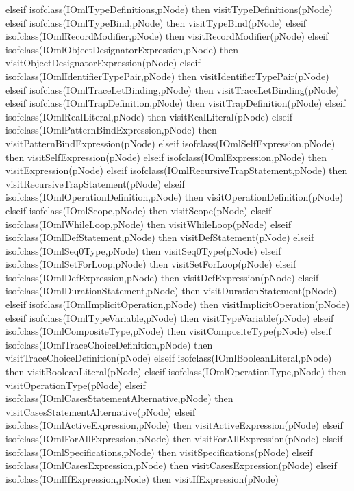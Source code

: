 \begin{vdm_al}
      elseif isofclass(IOmlTypeDefinitions,pNode) then visitTypeDefinitions(pNode)
      elseif isofclass(IOmlTypeBind,pNode) then visitTypeBind(pNode)
      elseif isofclass(IOmlRecordModifier,pNode) then visitRecordModifier(pNode)
      elseif isofclass(IOmlObjectDesignatorExpression,pNode) then visitObjectDesignatorExpression(pNode)
      elseif isofclass(IOmlIdentifierTypePair,pNode) then visitIdentifierTypePair(pNode)
      elseif isofclass(IOmlTraceLetBinding,pNode) then visitTraceLetBinding(pNode)
      elseif isofclass(IOmlTrapDefinition,pNode) then visitTrapDefinition(pNode)
      elseif isofclass(IOmlRealLiteral,pNode) then visitRealLiteral(pNode)
      elseif isofclass(IOmlPatternBindExpression,pNode) then visitPatternBindExpression(pNode)
      elseif isofclass(IOmlSelfExpression,pNode) then visitSelfExpression(pNode)
      elseif isofclass(IOmlExpression,pNode) then visitExpression(pNode)
      elseif isofclass(IOmlRecursiveTrapStatement,pNode) then visitRecursiveTrapStatement(pNode)
      elseif isofclass(IOmlOperationDefinition,pNode) then visitOperationDefinition(pNode)
      elseif isofclass(IOmlScope,pNode) then visitScope(pNode)
      elseif isofclass(IOmlWhileLoop,pNode) then visitWhileLoop(pNode)
      elseif isofclass(IOmlDefStatement,pNode) then visitDefStatement(pNode)
      elseif isofclass(IOmlSeq0Type,pNode) then visitSeq0Type(pNode)
      elseif isofclass(IOmlSetForLoop,pNode) then visitSetForLoop(pNode)
      elseif isofclass(IOmlDefExpression,pNode) then visitDefExpression(pNode)
      elseif isofclass(IOmlDurationStatement,pNode) then visitDurationStatement(pNode)
      elseif isofclass(IOmlImplicitOperation,pNode) then visitImplicitOperation(pNode)
      elseif isofclass(IOmlTypeVariable,pNode) then visitTypeVariable(pNode)
      elseif isofclass(IOmlCompositeType,pNode) then visitCompositeType(pNode)
      elseif isofclass(IOmlTraceChoiceDefinition,pNode) then visitTraceChoiceDefinition(pNode)
      elseif isofclass(IOmlBooleanLiteral,pNode) then visitBooleanLiteral(pNode)
      elseif isofclass(IOmlOperationType,pNode) then visitOperationType(pNode)
      elseif isofclass(IOmlCasesStatementAlternative,pNode) then visitCasesStatementAlternative(pNode)
      elseif isofclass(IOmlActiveExpression,pNode) then visitActiveExpression(pNode)
      elseif isofclass(IOmlForAllExpression,pNode) then visitForAllExpression(pNode)
      elseif isofclass(IOmlSpecifications,pNode) then visitSpecifications(pNode)
      elseif isofclass(IOmlCasesExpression,pNode) then visitCasesExpression(pNode)
      elseif isofclass(IOmlIfExpression,pNode) then visitIfExpression(pNode)

\end{vdm_al}
